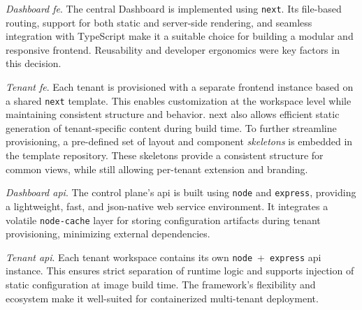 \documentclass[11pt, a4paper, oneside, listof=totoc]{scrartcl}
\begin{document}
            \begin{enumerate}[label={[\arabic*]:},
                ref=Challenge~\arabic*,
                leftmargin=*,
                itemsep=0.6\baselineskip]
                \item\label{chal:dashboardFE}
                    \textit{Dashboard \gls{fe}}.
                    The central Dashboard is implemented using \texttt{\gls{next}}.
                    Its file-based routing, support for both static and server-side rendering, and
                    seamless integration with TypeScript make it a suitable choice for building a
                    modular and responsive frontend.
                    Reusability and developer ergonomics were key factors in this decision.

                \item\label{chal:tenantFE}
                    \textit{Tenant \gls{fe}}.
                    Each tenant is provisioned with a separate frontend instance based on a shared
                    \texttt{\gls{next}} template.
                    This enables customization at the workspace level while maintaining consistent
                    structure and behavior.
                    \gls{next} also allows efficient static generation of tenant-specific content
                    during build time.
                    To further streamline provisioning, a pre-defined set of layout and component
                    \textit{skeletons} is embedded in the template repository.  
                    These skeletons provide a consistent structure for common views, while still
                    allowing per-tenant extension and branding.

                \item\label{chal:dashboardAPI}
                    \textit{Dashboard \gls{api}}.
                    The control plane's \gls{api} is built using \texttt{\gls{node}} and
                    \texttt{\gls{express}}, providing a lightweight, fast, and \gls{json}-native web
                    service environment.
                    It integrates a volatile \texttt{node-cache} layer for storing configuration
                    artifacts during tenant provisioning, minimizing external dependencies.

                \item\label{chal:tenantAPI}
                    \textit{Tenant \gls{api}}.
                    Each tenant workspace contains its own
                    \texttt{\gls{node}}~+~\texttt{\gls{express}} \gls{api} instance.
                    This ensures strict separation of runtime logic and supports injection of static
                    configuration at image build time.
                    The framework's flexibility and ecosystem make it well-suited for containerized
                    multi-tenant deployment.


\end{enumerate}
\end{document}
